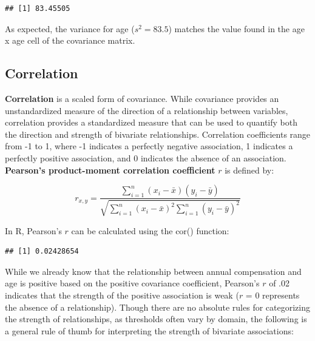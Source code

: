 \documentclass[]{book}
\newenvironment{Shaded}{\begin{snugshade}}{\end{snugshade}}
\newcommand{\CommentTok}[1]{\textcolor[rgb]{0.56,0.35,0.01}{\textit{#1}}}
\newcommand{\DataTypeTok}[1]{\textcolor[rgb]{0.13,0.29,0.53}{#1}}
\newcommand{\KeywordTok}[1]{\textcolor[rgb]{0.13,0.29,0.53}{\textbf{#1}}}
\newcommand{\NormalTok}[1]{#1}
\newcommand{\OperatorTok}[1]{\textcolor[rgb]{0.81,0.36,0.00}{\textbf{#1}}}
\newcommand{\StringTok}[1]{\textcolor[rgb]{0.31,0.60,0.02}{#1}}
\begin{document}
\begin{verbatim}
## [1] 83.45505
\end{verbatim}

As expected, the variance for age (\(s^{2} = 83.5\)) matches the value found in the age x age cell of the covariance matrix.

\hypertarget{correlation}{%
\subsection{Correlation}\label{correlation}}

\textbf{Correlation} is a scaled form of covariance. While covariance provides an unstandardized measure of the direction of a relationship between variables, correlation provides a standardized measure that can be used to quantify both the direction and strength of bivariate relationships. Correlation coefficients range from -1 to 1, where -1 indicates a perfectly negative association, 1 indicates a perfectly positive association, and 0 indicates the absence of an association. \textbf{Pearson's product-moment correlation coefficient} \(r\) is defined by:

\[ r_{x,y} = \frac{\displaystyle\sum_{i=1}^{n} (x_{i}-\bar{x})(y_{i}-\bar{y})}{\sqrt{\displaystyle\sum_{i=1}^{n} (x_{i}-\bar{x})^2 \displaystyle\sum_{i=1}^{n} (y_{i}-\bar{y})^2}} \]

In R, Pearson's \(r\) can be calculated using the cor() function:

\begin{Shaded}
\end{Shaded}

\begin{verbatim}
## [1] 0.02428654
\end{verbatim}

While we already know that the relationship between annual compensation and age is positive based on the positive covariance coefficient, Pearson's \(r\) of .02 indicates that the strength of the positive association is weak (\(r\) = 0 represents the absence of a relationship). Though there are no absolute rules for categorizing the strength of relationships, as thresholds often vary by domain, the following is a general rule of thumb for interpreting the strength of bivariate associations:
\end{document}

